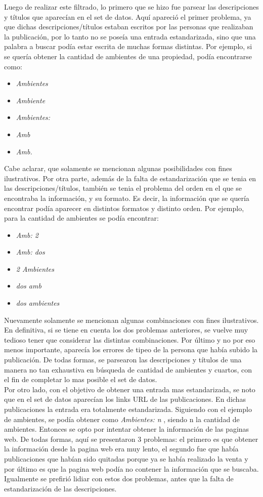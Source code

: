 \documentclass[a4paper, 10pt]{article}
\begin{document}
		Luego de realizar este filtrado, lo primero que se hizo fue parsear las descripciones y títulos que aparecían en el set de datos. Aquí apareció el primer problema, ya que dichas descripciones/títulos estaban escritos por las personas que realizaban la publicación, por lo tanto no se poseía una entrada estandarizada, sino que una palabra a buscar podía estar escrita de muchas formas distintas. Por ejemplo, si se quería obtener la cantidad de ambientes de una propiedad, podía encontrarse como:
			\begin{itemize}
				\item \emph{Ambientes}
				\item \emph{Ambiente}
				\item \emph{Ambientes:}
				\item \emph{Amb}
				\item \emph{Amb.} 
			\end{itemize}
		Cabe aclarar, que solamente se mencionan algunas posibilidades con fines ilustrativos. Por otra parte, además de la falta de estandarización que se tenia en las descripciones/títulos, también se tenia el problema del orden en el que se encontraba la información, y su formato. Es decir, la información que se quería encontrar podía aparecer en distintos formatos y distinto orden. Por ejemplo, para la cantidad de ambientes se podía encontrar: 
			\begin{itemize}
				\item \emph{Amb: 2}
				\item \emph{Amb: dos}
				\item \emph{2 Ambientes}
				\item \emph{dos amb}
				\item \emph{dos ambientes} 
			\end{itemize}
		Nuevamente solamente se mencionan algunas combinaciones con fines ilustrativos. En definitiva, si se tiene en cuenta los dos problemas anteriores, se vuelve muy tedioso tener que considerar las distintas combinaciones. Por último y no por eso menos importante, aparecía los errores de tipeo de la persona que había subido la publicación. De todas formas, se parsearon las descripciones y títulos de una manera no tan exhaustiva en búsqueda de cantidad de ambientes y cuartos, con el fin de completar lo mas posible el set de datos.
		\\
		Por otro lado, con el objetivo de obtener una entrada mas estandarizada, se noto que en el set de datos aparecían los links URL de las publicaciones. En dichas publicaciones la entrada era totalmente estandarizada. Siguiendo con el ejemplo de ambientes, se podía obtener como \emph{Ambientes: n }, siendo n la cantidad de ambientes. Entonces se opto por intentar obtener la información de las paginas web. De todas formas, aquí se presentaron 3 problemas: el primero es que obtener la información desde la pagina web era muy lento, el segundo fue que había publicaciones que habían sido quitadas porque ya se había realizado la venta y por último es que la pagina web podía no contener la información que se buscaba. Igualmente se prefirió lidiar con estos dos problemas, antes que la falta de estandarización de las descripciones.
\end{document}
